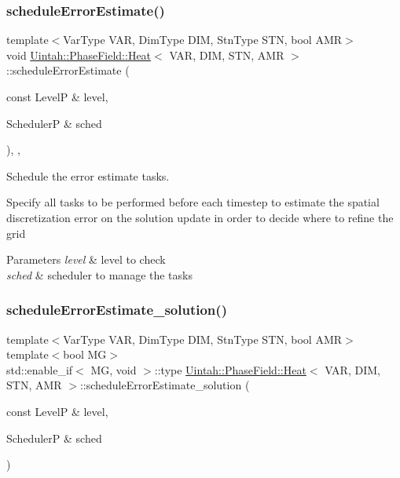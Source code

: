 \subsubsection{\texorpdfstring{schedule\+Error\+Estimate()}{scheduleErrorEstimate()}}
{\footnotesize\ttfamily template$<$Var\+Type V\+AR, Dim\+Type D\+IM, Stn\+Type S\+TN, bool A\+MR$>$ \\
void \hyperlink{classUintah_1_1PhaseField_1_1Heat}{Uintah\+::\+Phase\+Field\+::\+Heat}$<$ V\+AR, D\+IM, S\+TN, A\+MR $>$\+::schedule\+Error\+Estimate (\begin{DoxyParamCaption}\item[{const LevelP \&}]{level,  }\item[{SchedulerP \&}]{sched }\end{DoxyParamCaption})\hspace{0.3cm}{\ttfamily [override]}, {\ttfamily [protected]}, {\ttfamily [virtual]}}



Schedule the error estimate tasks. 

Specify all tasks to be performed before each timestep to estimate the spatial discretization error on the solution update in order to decide where to refine the grid


\begin{DoxyParams}{Parameters}
{\em level} & level to check \\
\hline
{\em sched} & scheduler to manage the tasks \\
\hline
\end{DoxyParams}
\mbox{\label{classUintah_1_1PhaseField_1_1Heat_a409db9828b044c7f8aec3b9833239678}} 
\subsubsection{\texorpdfstring{schedule\+Error\+Estimate\+\_\+solution()}{scheduleErrorEstimate\_solution()}\hspace{0.1cm}{\footnotesize\ttfamily [1/2]}}
{\footnotesize\ttfamily template$<$Var\+Type V\+AR, Dim\+Type D\+IM, Stn\+Type S\+TN, bool A\+MR$>$ \\
template$<$bool MG$>$ \\
std\+::enable\+\_\+if$<$ MG, void $>$\+::type \hyperlink{classUintah_1_1PhaseField_1_1Heat}{Uintah\+::\+Phase\+Field\+::\+Heat}$<$ V\+AR, D\+IM, S\+TN, A\+MR $>$\+::schedule\+Error\+Estimate\+\_\+solution (\begin{DoxyParamCaption}\item[{const LevelP \&}]{level,  }\item[{SchedulerP \&}]{sched }\end{DoxyParamCaption})\hspace{0.3cm}{\ttfamily [protected]}}



